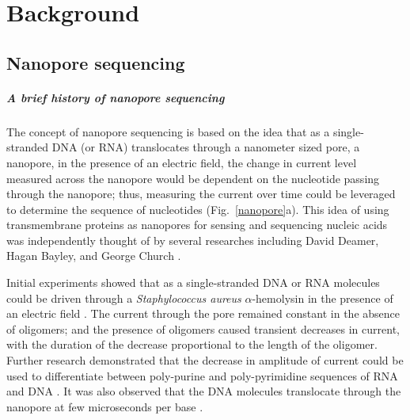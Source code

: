 \chapter{Background}
\label{ch2}

\section{Nanopore sequencing}

\paragraph{A brief history of nanopore sequencing}
The concept of nanopore sequencing is based on the idea that as a
single-stranded DNA (or RNA) translocates through a nanometer sized
pore, a nanopore, in the presence of an electric field, the change in
current level measured across the nanopore would be dependent on the
nucleotide passing through the nanopore; thus, measuring the current
over time could be leveraged to determine the sequence of nucleotides
(Fig.~\ref{nanopore}a).
%
This idea of using transmembrane proteins as nanopores for sensing and
sequencing nucleic acids was independently thought of by several
researches including David Deamer, Hagan Bayley, and George Church
\citep{deamer2016three,bayley2015nanopore,branton2010potential}.

Initial experiments showed that as a single-stranded DNA or RNA
molecules could be driven through a \emph{Staphylococcus aureus}
$\alpha$-hemolysin in the presence of an electric field
\citep{kasianowicz1996characterization}. The current through the pore
remained constant in the absence of oligomers; and the presence of
oligomers caused transient decreases in current, with the duration of
the decrease proportional to the length of the oligomer.
Further research demonstrated that the decrease in amplitude of current
could be used to differentiate between poly-purine and poly-pyrimidine
sequences of RNA \citep{akeson1999microsecond} and DNA
\citep{meller2000rapid}. It was also observed that the DNA molecules
translocate through the nanopore at few microseconds per base
\citep{meller2000rapid}.

